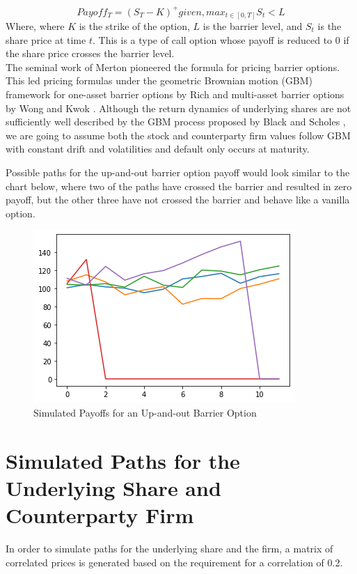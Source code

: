 \documentclass[11pt]{article}
\begin{document}
\[
Payoff_T= (S_T - K)^+ given, max_{t \in [0,T]} S_t < L
\]
Where, where $K$ is the strike of the option, $L$ is the barrier level, and $S_t$ is the share price at time $t$.  This is a type of call option whose payoff is reduced to 0 if the share price crosses the barrier level. \\

The seminal work of Merton \cite{Merton1} pioneered the formula for pricing barrier options.  This led pricing formulas under the geometric Brownian motion (GBM) framework for one-asset barrier options by Rich \cite{RD1} and multi-asset barrier options by Wong and Kwok \cite{WK1}. Although the return dynamics of underlying shares are not sufficiently well described by the GBM process proposed by Black and Scholes \cite{BS1}, we are going to assume both the stock and counterparty firm values follow GBM  with constant drift and volatilities and default only occurs at maturity.

Possible paths for the up-and-out barrier option payoff would look similar to the chart below, where two of the paths have crossed the barrier and resulted in zero payoff, but the other three have not crossed the barrier and behave like a vanilla option.

\begin{figure}
    \centering
    \caption{Simulated Payoffs for an Up-and-out Barrier Option}
    \includegraphics{images/barrier-example.png}
\end{figure}

\section{Simulated Paths for the Underlying Share and Counterparty Firm
}

 In order to simulate paths for the underlying share and the firm, a matrix of correlated prices is generated based on the requirement for a correlation of 0.2. 
 
\end{document}
